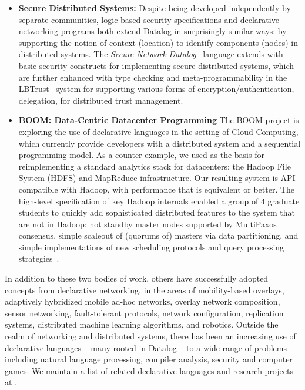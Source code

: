 \begin{itemize}

\item {\bf Secure Distributed Systems:} Despite being developed
independently by separate communities, logic-based security
specifications and declarative networking programs both extend Datalog
in surprisingly similar ways: by supporting the notion of context
(location) to identify components (nodes) in distributed systems.  The
{\em Secure Network Datalog}~\cite{decsec} language extends \Dlog with
basic security constructs for implementing secure distributed systems,
which are further enhanced with type checking and meta-programmability
in the LBTrust~\cite{lbtrust} system for supporting various forms of
encryption/authentication, delegation, for distributed trust
management. 

\item {\bf BOOM: Data-Centric Datacenter Programming}
The BOOM project is exploring the use of declarative languages in the 
setting of Cloud Computing, which currently provide developers with a distributed system and a sequential programming model.  As a counter-example, we used \Overlog as the basis for reimplementing a standard analytics stack for datacenters: the Hadoop File System (HDFS) and MapReduce infrastructure.  Our resulting system is API-compatible with Hadoop, with performance that is equivalent or better.  The high-level \Overlog specification of key Hadoop internals enabled a group of 4 graduate students to quickly add sophisticated distributed features to the system that are not in Hadoop:  hot standby master nodes supported by MultiPaxos consensus, simple scaleout of (quorums of) masters via data partitioning, and simple implementations of new scheduling protocols and query processing strategies~\cite{boom}.  
\end{itemize}

In addition to these two bodies of work, others have successfully
adopted concepts from declarative networking, in the areas of
mobility-based overlays, adaptively hybridized mobile ad-hoc
networks, overlay network composition, sensor networking, fault-tolerant
protocols, network configuration, replication systems, distributed machine 
learning algorithms, and robotics.  
Outside the realm of networking and distributed systems, 
there has been an increasing use of declarative languages -- many rooted in Datalog -- to a wide range of problems including natural language processing, compiler analysis, security and computer games.  We maintain a list of related declarative languages and research projects at .  

